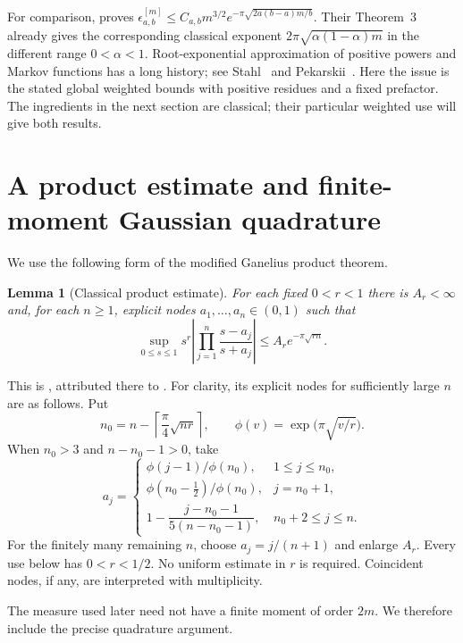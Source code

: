 \documentclass[11pt]{article}
\newtheorem{lemma}[theorem]{Lemma}
\numberwithin{equation}{section}
\begin{document}
For comparison, \cite[Theorem~4]{FF} proves
$\epsilon^{[m]}_{a,b}\le C_{a,b}m^{3/2}e^{-\pi\sqrt{2a(b-a)m/b}}$.
Their Theorem~3 already gives the corresponding classical exponent
$2\pi\sqrt{\alpha(1-\alpha)m}$ in the different range $0<\alpha<1$.
Root-exponential approximation of positive powers and Markov functions
has a long history; see Stahl~\cite{Stahl} and Pekarskii~\cite{Pekarskii}.
Here the issue is the stated global weighted bounds with positive
residues and a fixed prefactor. The ingredients in the next section are
classical; their particular weighted use will give both results.

\section{A product estimate and finite-moment Gaussian quadrature}

We use the following form of the modified Ganelius product theorem.

\begin{lemma}[Classical product estimate]\label{lem:Ganelius}
For each fixed $0<r<1$ there is $A_r<\infty$ and, for each $n\ge1$,
explicit nodes $a_1,\ldots,a_n\in(0,1)$ such that
\begin{equation}\label{eq:Ganelius}
 \sup_{0\le s\le1}s^r
  \left|\prod_{j=1}^n\frac{s-a_j}{s+a_j}\right|
       \le A_r e^{-\pi\sqrt{rn}}.
\end{equation}
\end{lemma}

This is \cite[Definition~2.5 and Theorem~2.6]{TOS}, attributed there to
\cite[Lemma~1]{JH}. For clarity, its explicit nodes for sufficiently
large $n$ are as follows. Put
\[
 n_0=n-\left\lceil\frac\pi4\sqrt{nr}\right\rceil,
 \qquad \phi(v)=\exp\bigl(\pi\sqrt{v/r}\bigr).
\]
When $n_0>3$ and $n-n_0-1>0$, take
\begin{equation}\label{eq:Gnodes}
 a_j=\begin{cases}
 \phi(j-1)/\phi(n_0),&1\le j\le n_0,\\
 \phi(n_0-\tfrac12)/\phi(n_0),&j=n_0+1,\\
 1-\dfrac{j-n_0-1}{5(n-n_0-1)},&n_0+2\le j\le n.
 \end{cases}
\end{equation}
For the finitely many remaining $n$, choose $a_j=j/(n+1)$ and enlarge
$A_r$. Every use below has $0<r<1/2$. No uniform estimate in $r$ is
required. Coincident nodes, if any, are interpreted with multiplicity.

The measure used later need not have a finite moment of order $2m$.
We therefore include the precise quadrature argument.
\end{document}
